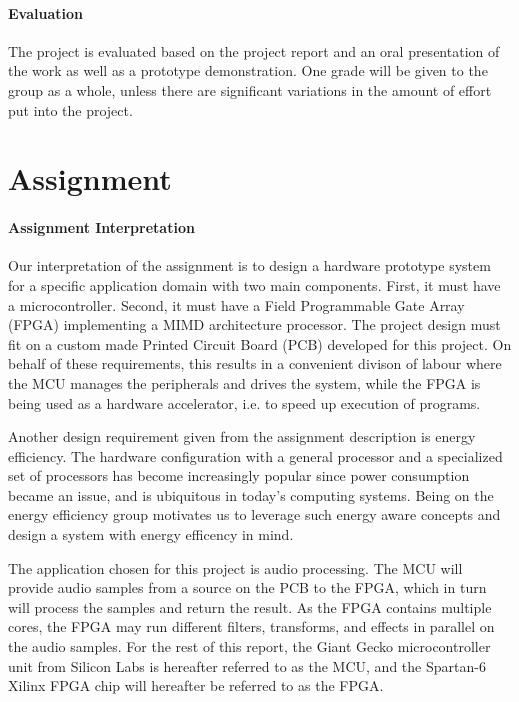 \paragraph{Evaluation}
The project is evaluated based on the project report and an oral presentation of
the work as well as a prototype demonstration. One grade will be given to the
group as a whole, unless there are significant variations in the amount of
effort put into the project.

\section{Assignment}

\paragraph{Assignment Interpretation}\label{intro:our-assignment-interpretation}
Our interpretation of the assignment is to design a hardware prototype system for a
specific application domain with two main components. First, it must have a
microcontroller. Second, it must have a Field Programmable Gate Array (FPGA)
implementing a MIMD architecture processor. The project design must fit on a custom
made Printed Circuit Board (PCB) developed for this project. On behalf of these
requirements, this results in a convenient divison of labour where the MCU manages
the peripherals and drives the system, while the FPGA is being used as a hardware
accelerator, i.e. to speed up execution of programs.

Another design requirement given from the assignment description is energy
efficiency. The hardware configuration with a general processor and a
specialized set of processors has become increasingly popular since power
consumption became an issue, and is ubiquitous in today's computing systems.
Being on the energy efficiency group motivates us to leverage such energy aware
concepts and design a system with energy efficency in mind.


The application chosen for this project is audio processing. The MCU will
provide audio samples from a source on the PCB to the FPGA, which in turn will
process the samples and return the result. As the FPGA contains multiple cores,
the FPGA may run different filters, transforms, and effects in parallel on the
audio samples. For the rest of this report, the Giant Gecko microcontroller unit
from Silicon Labs is hereafter referred to as the MCU, and the Spartan-6 Xilinx
FPGA chip will hereafter be referred to as the FPGA.

